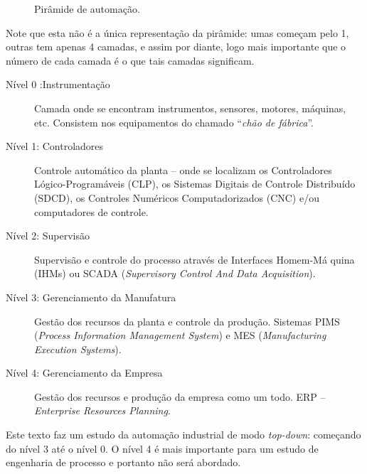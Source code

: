 \begin{figure}[htb]
\begin{center}
\begin{tikzpicture}[y=0.80pt, x=0.8pt,xscale=0.4,yscale=-0.4, inner sep=0pt, outer sep=0pt]
\end{tikzpicture}
	\end{center}
	\caption{Pirâmide de automação.}
	\label{fig:piramide}
\end{figure}

Note que esta não é a única representação da pirâmide: umas começam pelo 1, outras tem apenas 4 camadas, e assim por diante, logo mais importante que o número de cada camada é o que tais camadas significam.

\begin{description}
	\item[Nível 0 :Instrumentação] Camada onde se encontram instrumentos, sensores, motores,
máquinas, etc. Consistem nos equipamentos do chamado ``\emph{chão de fábrica}''.
\item[Nível 1: Controladores] Controle automático da planta -- onde se localizam os Controladores
Lógico-Programáveis (CLP), os Sistemas Digitais de Controle Distribuído (SDCD), os Controles Numéricos Computadorizados (CNC) e/ou computadores de controle.
\item[Nível 2: Supervisão] Supervisão e controle do processo através de Interfaces Homem-Má
quina (IHMs) ou SCADA (\emph{Supervisory Control And Data Acquisition}).
\item[Nível 3: Gerenciamento da Manufatura] Gestão dos recursos da planta e controle da produção.  Sistemas PIMS
(\emph{Process Information Management System}) e MES (\emph{Manufacturing Execution Systems}).
\item[Nível 4: Gerenciamento da Empresa] Gestão dos recursos e produção da empresa como um todo. ERP –
\emph{Enterprise Resources Planning}.
\end{description}

Este texto faz um estudo da automação industrial de modo \emph{top-down}: começando do nível 3 até o nível 0. O nível 4 é mais importante para um estudo de engenharia de processo e portanto não será abordado.